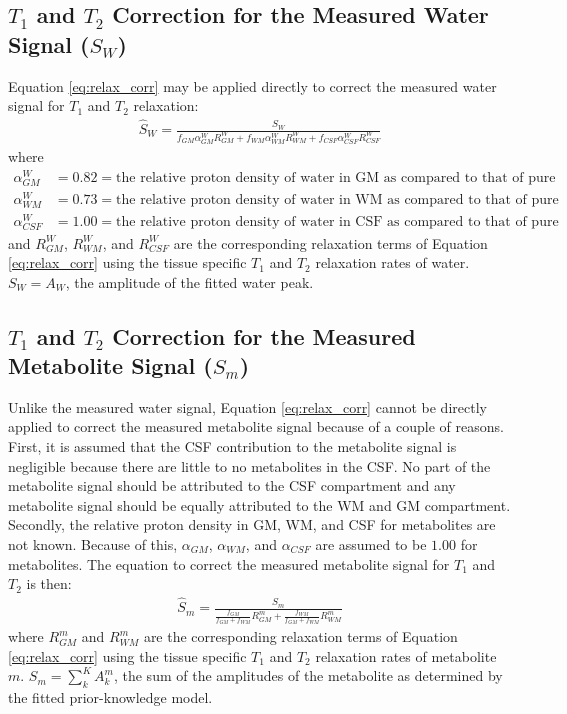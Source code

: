 \documentclass{article}
\begin{document}
\subsection{$T_1$ and $T_2$ Correction for the Measured Water Signal ($S_W$)}
Equation \eqref{eq:relax_corr} may be applied directly to correct the measured water signal for $T_1$ and $T_2$ relaxation:
\begin{align}
	\boxed{\hat{S}_W = \frac{S_W}{f_{GM} \alpha_{GM}^{W} R_{GM}^{W} + f_{WM} \alpha_{WM}^{W} R_{WM}^{W} + f_{CSF} \alpha_{CSF}^{W}  R_{CSF}^{W}}}
	\label{eq:relax_corr_water}
\end{align}
where
\begin{align*}
	\alpha_{GM}^{W} &= 0.82 = \text{the relative proton density of water in GM as compared to that of pure water} \\
	\alpha_{WM}^{W} &= 0.73 = \text{the relative proton density of water in WM as compared to that of pure water} \\
	\alpha_{CSF}^{W} &= 1.00 = \text{the relative proton density of water in CSF as compared to that of pure water}
\end{align*}
and $R_{GM}^{W}$, $R_{WM}^{W}$, and $R_{CSF}^{W}$ are the corresponding relaxation terms of Equation \eqref{eq:relax_corr} using the tissue specific $T_1$ and $T_2$ relaxation rates of water. $\boxed{S_W = A_W}$, the amplitude of the fitted water peak.

\subsection{$T_1$ and $T_2$ Correction for the Measured Metabolite Signal ($S_m$)}
Unlike the measured water signal, Equation \eqref{eq:relax_corr} cannot be directly applied to correct the measured metabolite signal because of a couple of reasons. First, it is assumed that the CSF contribution to the metabolite signal is negligible because there are little to no metabolites in the CSF. No part of the metabolite signal should be attributed to the CSF compartment and any metabolite signal should be equally attributed to the WM and GM compartment. Secondly, the relative proton density in GM, WM, and CSF for metabolites are not known. Because of this, $\alpha_{GM}$, $\alpha_{WM}$, and $\alpha_{CSF}$ are assumed to be $1.00$ for metabolites. The equation to correct the measured metabolite signal for $T_1$ and $T_2$ is then:
\begin{align}
	\boxed{\hat{S}_m = \frac{S_m}{\frac{f_{GM}}{f_{GM}+f_{WM}} R_{GM}^{m} + \frac{f_{WM}}{f_{GM}+f_{WM}}  R_{WM}^{m}}}
	\label{eq:relax_corr_metab}
\end{align}
where $R_{GM}^{m}$ and $R_{WM}^{m}$ are the corresponding relaxation terms of Equation \eqref{eq:relax_corr} using the tissue specific $T_1$ and $T_2$ relaxation rates of metabolite $m$. $\boxed{S_m = \sum_k^K A_k^m}$, the sum of the amplitudes of the metabolite as determined by the fitted prior-knowledge model.
\end{document}
